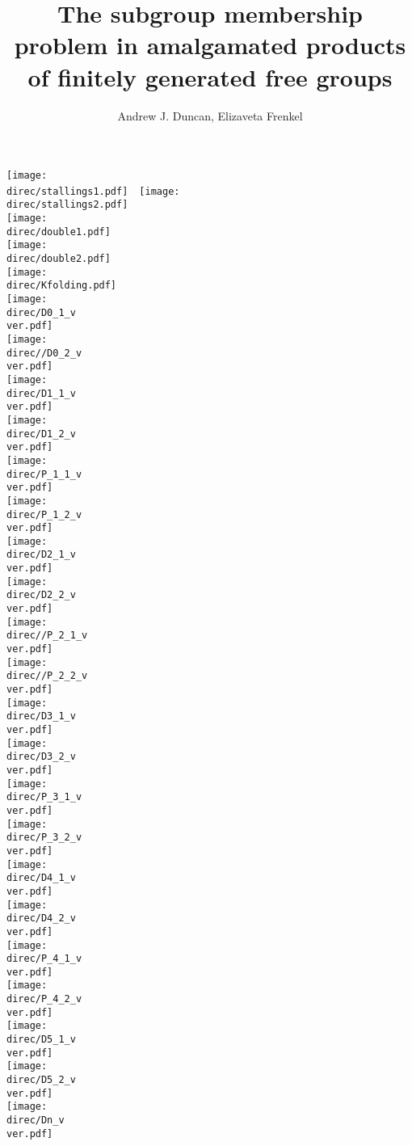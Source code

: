 \documentclass[a4paper,12pt]{article}
\title{The subgroup membership problem in amalgamated products of 
finitely generated free groups
}
\author{Andrew J. Duncan, Elizaveta Frenkel}
\newcommand{\direc}{cyclic}
\newcommand{\ver}{1}
\numberwithin{equation}{section}
\numberwithin{figure}{section}
\begin{document}
\texttt{[image: \\direc/stallings1.pdf]}~~\texttt{[image: \\direc/stallings2.pdf]}\\
\texttt{[image: \\direc/double1.pdf]}\\
\texttt{[image: \\direc/double2.pdf]}\\
\texttt{[image: \\direc/Kfolding.pdf]}\\
\texttt{[image: \\direc/D0\_1\_v\\ver.pdf]}\\
\texttt{[image: \\direc//D0\_2\_v\\ver.pdf]}\\
\texttt{[image: \\direc/D1\_1\_v\\ver.pdf]}\\
\texttt{[image: \\direc/D1\_2\_v\\ver.pdf]}\\
\texttt{[image: \\direc/P\_1\_1\_v\\ver.pdf]}\\
\texttt{[image: \\direc/P\_1\_2\_v\\ver.pdf]}\\
\texttt{[image: \\direc/D2\_1\_v\\ver.pdf]}\\
\texttt{[image: \\direc/D2\_2\_v\\ver.pdf]}\\
\texttt{[image: \\direc//P\_2\_1\_v\\ver.pdf]}\\
\texttt{[image: \\direc//P\_2\_2\_v\\ver.pdf]}\\
\texttt{[image: \\direc/D3\_1\_v\\ver.pdf]}\\
\texttt{[image: \\direc/D3\_2\_v\\ver.pdf]}\\
\texttt{[image: \\direc/P\_3\_1\_v\\ver.pdf]}\\
\texttt{[image: \\direc/P\_3\_2\_v\\ver.pdf]}\\
\texttt{[image: \\direc/D4\_1\_v\\ver.pdf]}\\
\texttt{[image: \\direc/D4\_2\_v\\ver.pdf]}\\
\texttt{[image: \\direc/P\_4\_1\_v\\ver.pdf]}\\
\texttt{[image: \\direc/P\_4\_2\_v\\ver.pdf]}\\
\texttt{[image: \\direc/D5\_1\_v\\ver.pdf]}\\
\texttt{[image: \\direc/D5\_2\_v\\ver.pdf]}\\
\texttt{[image: \\direc/Dn\_v\\ver.pdf]}\\
\begin{comment}
\texttt{[image: \\direc/D0\_1\_v2.pdf]}\\
\texttt{[image: \\direc//D0\_2\_v2.pdf]}\\
\texttt{[image: \\direc/D1\_1\_v2.pdf]}\\
\texttt{[image: \\direc/D1\_2\_v2.pdf]}\\
\texttt{[image: \\direc/Dn\_v2.pdf]}\\
\end{comment}
\end{document}
